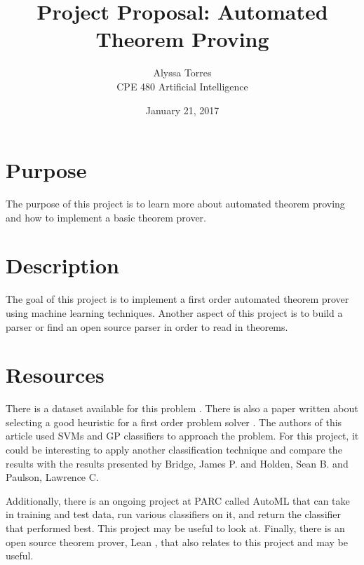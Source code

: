 \documentclass[12pt]{article}
\begin{document}
\title{\textbf{Project Proposal: Automated Theorem Proving}}
\author{Alyssa Torres\\
CPE 480 Artificial Intelligence}
\date{January 21, 2017}
\maketitle

\section{Purpose}
The purpose of this project is to learn more about automated theorem proving and how to implement a basic theorem prover. 

\section{Description}
The goal of this project is to implement a first order automated theorem prover using machine learning techniques. Another aspect of this project is to build a parser or find an open source parser in order to read in theorems. 

\section{Resources}
There is a dataset available for this problem \cite{dataset}. There is also a paper written about selecting a good heuristic for a first order problem solver \cite{ml-fotp}. The authors of this article used SVMs and GP classifiers to approach the problem. For this project, it could be interesting to apply another classification technique and compare the results with the results presented by Bridge, James P. and Holden, Sean B. and Paulson, Lawrence C. 

Additionally, there is an ongoing project at PARC called AutoML \cite{automl} that can take in training and test data, run various classifiers on it, and return the classifier that performed best. This project may be useful to look at. Finally, there is an open source theorem prover, Lean \cite{lean}, that also relates to this project and may be useful.


\printbibliography
\end{document}
